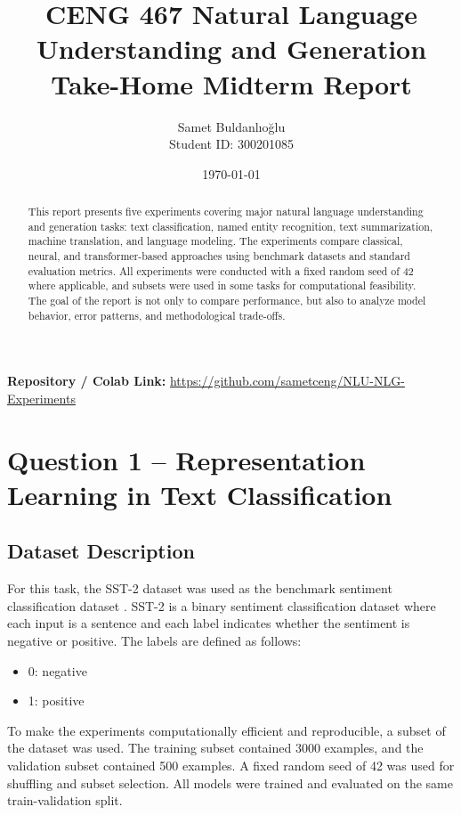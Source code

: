 \documentclass[11pt,a4paper]{article}
\title{CENG 467 Natural Language Understanding and Generation\\Take-Home Midterm Report}
\author{Samet Buldanlıoğlu\\Student ID: 300201085}
\date{\today}
\begin{document}
\maketitle

\begin{center}
\textbf{Repository / Colab Link:} \url{https://github.com/sametceng/NLU-NLG-Experiments}
\end{center}

\begin{abstract}
This report presents five experiments covering major natural language understanding and generation tasks: text classification, named entity recognition, text summarization, machine translation, and language modeling. The experiments compare classical, neural, and transformer-based approaches using benchmark datasets and standard evaluation metrics. All experiments were conducted with a fixed random seed of 42 where applicable, and subsets were used in some tasks for computational feasibility. The goal of the report is not only to compare performance, but also to analyze model behavior, error patterns, and methodological trade-offs.
\end{abstract}

\tableofcontents
\newpage

\section{Question 1 -- Representation Learning in Text Classification}

\subsection{Dataset Description}

For this task, the SST-2 dataset was used as the benchmark sentiment classification dataset \cite{socher2013recursive}. SST-2 is a binary sentiment classification dataset where each input is a sentence and each label indicates whether the sentiment is negative or positive. The labels are defined as follows:

\begin{itemize}[leftmargin=*]
    \item 0: negative
    \item 1: positive
\end{itemize}

To make the experiments computationally efficient and reproducible, a subset of the dataset was used. The training subset contained 3000 examples, and the validation subset contained 500 examples. A fixed random seed of 42 was used for shuffling and subset selection. All models were trained and evaluated on the same train-validation split.
\end{document}
